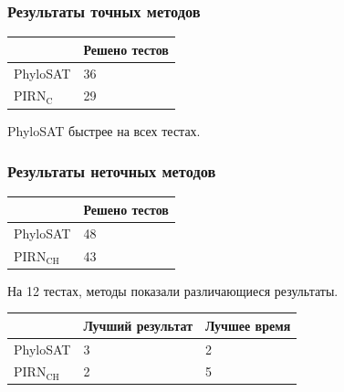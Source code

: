 \documentclass[hyperref={unicode}]{beamer}
\begin{document}
\begin{frame}
\frametitle{Результаты точных методов}

\begin{table}
\begin{tabular}{l | l}
	& Решено тестов \\
	\hline
	PhyloSAT & 36 \\
	PIRN$\mathrm{_C}$ & 29 \\
\end{tabular}
\end{table}

PhyloSAT быстрее на всех тестах.

\end{frame}

\begin{frame}
\frametitle{Результаты неточных методов}

\begin{table}
\begin{tabular}{l | l}
	& Решено тестов \\
	\hline
	PhyloSAT & 48 \\
	PIRN$\mathrm{_{CH}}$ & 43 \\
\end{tabular}
\end{table}

На 12 тестах, методы показали различающиеся результаты.

\begin{table}
\begin{tabular}{l | l | l}
	& Лучший результат & Лучшее время \\
	\hline
	PhyloSAT & 3 & 2 \\
	PIRN$\mathrm{_{CH}}$ & 2 & 5 \\
\end{tabular}
\end{table}

\end{frame}
\end{document}
